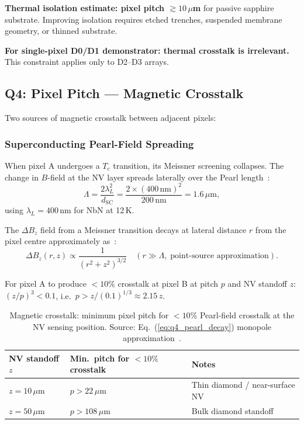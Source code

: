 \textbf{Thermal isolation estimate: pixel pitch $\gtrsim 10\,\mu$m} for
passive sapphire substrate. Improving isolation requires etched trenches, suspended
membrane geometry, or thinned substrate.

\textbf{For single-pixel D0/D1 demonstrator: thermal crosstalk is irrelevant.}
This constraint applies only to D2--D3 arrays.

\subsection{Q4: Pixel Pitch --- Magnetic Crosstalk}
\label{sec:q4}

Two sources of magnetic crosstalk between adjacent pixels:

\subsubsection{Superconducting Pearl-Field Spreading}
\label{sec:q4_pearl}

When pixel A undergoes a $T_c$ transition, its Meissner screening collapses.
The change in $B$-field at the NV layer spreads laterally over the Pearl
length~\cite{Pearl1964}: %
\begin{equation}
  \Lambda = \frac{2\lambda_L^2}{d_\mathrm{SC}}
  = \frac{2 \times (400\,\text{nm})^2}{200\,\text{nm}}
  = 1.6\,\mu\text{m},
  \label{eq:q4_pearl_length}
\end{equation}
using $\lambda_L = 400$\,nm for NbN at 12\,K.

The $\Delta B_z$ field from a Meissner transition decays at lateral distance $r$
from the pixel centre approximately as~\cite{Kogan2007}: %
\begin{equation}
  \Delta B_z(r, z) \propto \frac{1}{(r^2 + z^2)^{3/2}}
  \quad (r \gg \Lambda,\;\text{point-source approximation}).
  \label{eq:q4_pearl_decay}
\end{equation}

For pixel A to produce $<10\%$ crosstalk at pixel B at pitch $p$ and NV standoff $z$:
$(z/p)^3 < 0.1$, i.e.\ $p > z / (0.1)^{1/3} \approx 2.15\,z$.

\begin{table}[ht]
\centering
\caption{Magnetic crosstalk: minimum pixel pitch for $<10\%$ Pearl-field crosstalk
  at the NV sensing position. Source: Eq.~(\ref{eq:q4_pearl_decay}) monopole
  approximation~\cite{Kogan2007}.} %
\label{tab:q4_mag_crosstalk}
\small
\begin{tabular}{@{}lll@{}}
\toprule
NV standoff $z$ & Min.\ pitch for $<10\%$ crosstalk & Notes \\
\midrule
$z = 10\,\mu$m & $p > 22\,\mu$m & Thin diamond / near-surface NV \\
$z = 50\,\mu$m & $p > 108\,\mu$m & Bulk diamond standoff \\
\bottomrule
\end{tabular}
\end{table}

